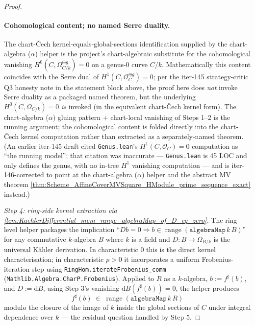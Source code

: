 \begin{proof}
  \paragraph{Cohomological content; no named Serre duality.} The chart-\v Cech kernel-equals-global-sections identification supplied by the chart-algebra (\(\alpha\)) helper is the project's chart-algebraic substitute for the cohomological vanishing \(H^0(C, \Omega_{C/k}^{\oplus g}) = 0\) on a genus-\(0\) curve \(C/k\). Mathematically this content coincides with the Serre dual of \(H^1(C, \mathcal O_C^{\oplus g}) = 0\); per the iter-145 strategy-critic Q3 honesty note in the statement block above, the proof here does \emph{not} invoke Serre duality as a packaged named theorem, but the underlying \(H^0(C, \Omega_{C/k}) = 0\) \emph{is} invoked (in the equivalent chart-\v Cech kernel form). The chart-algebra (\(\alpha\)) gluing pattern + chart-local vanishing of Steps 1--2 is the running argument; the cohomological content is folded directly into the chart-\v Cech kernel computation rather than extracted as a separately-named theorem. (An earlier iter-145 draft cited \texttt{Genus.lean}'s \(H^{1}(C, \mathcal O_C) = 0\) computation as ``the running model''; that citation was inaccurate — \texttt{Genus.lean} is 45 LOC and only defines the genus, with no in-tree \(H^{1}\) vanishing computation — and is iter-146-corrected to point at the chart-algebra (\(\alpha\)) helper and the abstract MV theorem \cref{thm:Scheme_AffineCoverMVSquare_HModule_prime_sequence_exact} instead.)

  \emph{Step 4: ring-side kernel extraction via \cref{lem:KaehlerDifferential_mem_range_algebraMap_of_D_eq_zero}.} The ring-level helper packages the implication ``\(D b = 0 \Rightarrow b \in \operatorname{range}(\mathtt{algebraMap}\,k\,B)\)'' for any commutative \(k\)-algebra \(B\) where \(k\) is a field and \(D \colon B \to \Omega_{B/k}\) is the universal K\"ahler derivation. In characteristic \(0\) this is the direct kernel characterisation; in characteristic \(p > 0\) it incorporates a uniform Frobenius-iteration step using \texttt{RingHom.iterateFrobenius\_comm} (\texttt{Mathlib.Algebra.CharP.Frobenius}). Applied to \(R\) as a \(k\)-algebra, \(b := f^{\sharp}(b)\), and \(D := \mathrm dB\), using Step 3's vanishing \(\mathrm dB(f^{\sharp}(b)) = 0\), the helper produces
  \[
    f^{\sharp}(b) \;\in\; \operatorname{range}(\mathtt{algebraMap}\,k\,R)
  \]
  modulo the closure of the image of \(k\) inside the global sections of \(C\) under integral dependence over \(k\) — the residual question handled by Step 5.


\end{proof}
